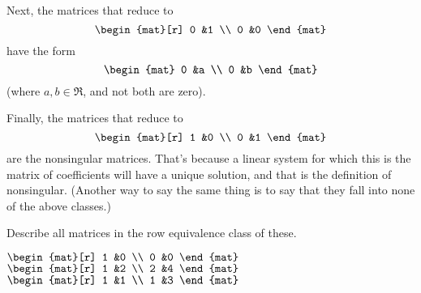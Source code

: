 \begin{exercises}
\begin{answer}
       Next, the matrices that reduce to 
       \begin{equation*}
         \begin{mat}[r]
           0  &1  \\
           0  &0
         \end{mat}
       \end{equation*}
       have the form
       \begin{equation*}
         \begin{mat}
           0  &a \\
           0  &b
         \end{mat}
       \end{equation*}
       (where \( a,b\in\Re \), and not both are zero).  

       Finally, the matrices that reduce to 
       \begin{equation*}
         \begin{mat}[r]
           1  &0  \\
           0  &1
         \end{mat}
       \end{equation*}
       are the nonsingular matrices.
       That's because a linear system for which this is the matrix of
       coefficients will have a unique solution, and that is the definition
       of nonsingular.
       (Another way to say the same thing is to say that they fall into none
       of the above classes.)
     \end{answer}
  \item 
    Describe all matrices in the row equivalence class of
    these.
    \begin{exparts*}
       \partsitem  \(
           \begin{mat}[r]
             1  &0  \\
             0  &0
           \end{mat}  \)
       \partsitem  \(
           \begin{mat}[r]
             1  &2      \\
             2  &4
           \end{mat} \)
       \partsitem \(
           \begin{mat}[r]
             1  &1      \\
             1  &3
           \end{mat} \)
    \end{exparts*}
    \begin{answer}
      \begin{exparts}

\end{exparts}
\end{answer}
\end{exercises}
